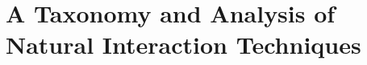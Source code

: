\documentclass[review]{fcs}
\newcommand{\ccite}{\textcolor[rgb]{0,0,1}{[cite]}}
\begin{document}
\section{A Taxonomy and Analysis of Natural Interaction Techniques}
\label{section3}



\end{document}
